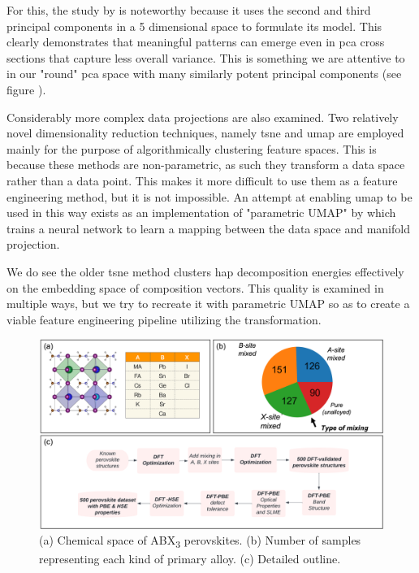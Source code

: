 \documentclass[twoside, twocolumn, 9pt, draft]{article}
\begin{document}
For this, the study by \citet{rajan-2009-princ-compon} is noteworthy
because it uses the second and third principal components in a 5
dimensional space to formulate its model. This clearly demonstrates
that meaningful patterns can emerge even in \acrshort{pca} cross sections that
capture less overall variance. This is something we are attentive to
in our "round" \acrshort{pca} space with many similarly potent principal
components (see figure \label{fig:scree}).

Considerably more complex data projections are also examined. Two
relatively novel dimensionality reduction techniques, namely
\acrfull{tsne}
\cite{maaten-2008-visual-high} and \Acrfull{umap} \cite{mcinnes-2018-umap} are employed mainly for the
purpose of algorithmically clustering feature spaces. This is because
these methods are non-parametric, as such they transform a data space
rather than a data point. This makes it more difficult to use them as
a feature engineering method, but it is not impossible. An attempt at
enabling \acrshort{umap} to be used in this way exists as an implementation of
"parametric UMAP" by \citet{mcinnes-2018-python-umap} which trains a
neural network to learn a mapping between the data space and manifold
projection.

We do see the older \acrshort{tsne} method clusters \acrshort{hap} decomposition energies
effectively on the embedding space of composition vectors. This
quality is examined in multiple ways, but we try to recreate it with
parametric UMAP so as to create a viable feature engineering pipeline
utilizing the transformation.

\begin{figure}
\centering
\includegraphics[h,width=.9\linewidth]{outline.png}
\caption{\label{fig:outline} (a) Chemical space of ABX\textsubscript{3} perovskites. (b) Number of samples representing each kind of primary alloy. (c) Detailed outline.}
\end{figure}
\end{document}
